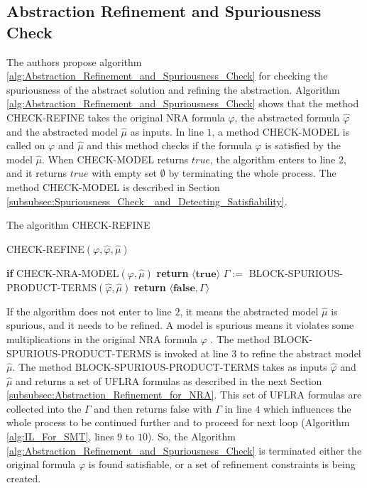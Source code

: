 \subsection{Abstraction Refinement and Spuriousness Check}
\label{subsec:Abstraction_Refinement_and_Spuriousness_Check}
The authors propose algorithm \ref{alg:Abstraction_Refinement_and_Spuriousness_Check} for checking the spuriousness of the abstract solution and refining the abstraction.
Algorithm \ref{alg:Abstraction_Refinement_and_Spuriousness_Check} shows that the method CHECK-REFINE takes the original NRA formula $\varphi$, the abstracted formula $\hat{\varphi}$ and the abstracted model $\hat{\mu}$ as inputs.
In line $1$, a method CHECK-MODEL is called on $\varphi$ and $\hat{\mu}$ and this method checks if the formula $\varphi$ is satisfied by the model $\hat{\mu}$.
When CHECK-MODEL returns $true$, the algorithm enters to line $2$, and it returns $true$ with empty set $\emptyset$ by terminating the whole process.
The method CHECK-MODEL is described in Section \ref{subsubsec:Spuriousness_Check_ and_Detecting_Satisfiability}.\newline

\begin{algorithm}
\caption{The algorithm CHECK-REFINE \cite{Cimatti:2018:ILS:3274693.3230639}} 
\label{alg:Abstraction_Refinement_and_Spuriousness_Check}
CHECK-REFINE$(\varphi, \hat{\varphi}, \hat{\mu})$
\begin{algorithmic}[1]
\State \textbf{if} CHECK-NRA-MODEL$(\varphi, \hat{\mu})$
\State \hspace{5mm}\textbf{return} $\langle \textbf{true} \rangle$
\State $\Gamma := $ BLOCK-SPURIOUS-PRODUCT-TERMS$(\hat{\varphi}, \hat{\mu})$
\State \textbf{return} $\langle \textbf{false}, \Gamma \rangle$
\end{algorithmic}
\end{algorithm}

\noindent If the algorithm does not enter to line $2$, it means the abstracted model $\hat{\mu}$ is spurious, and it needs to be refined.
A model is spurious means it violates some multiplications in the original NRA formula $\varphi$ \cite{Cimatti:2018:ILS:3274693.3230639}.
 The method  BLOCK-SPURIOUS-PRODUCT-TERMS is invoked at line $3$ to refine the abstract model $\hat{\mu}$.
The method BLOCK-SPURIOUS-PRODUCT-TERMS takes as inputs $\hat{\varphi}$ and $\hat{\mu}$ and returns a set of UFLRA formulas as described in the next Section \ref{subsubsec:Abstraction_Refinement_for_NRA}.
This set of UFLRA formulas are collected into the $\Gamma$ and then returns false with $\Gamma$ in line $4$ which influences the whole process to be continued further and to proceed for next loop (Algorithm \ref{alg:IL_For_SMT}, lines $9$ to $10$).
So, the Algorithm \ref{alg:Abstraction_Refinement_and_Spuriousness_Check} is terminated either the original formula $\varphi$ is found satisfiable, or a set of refinement constraints is being created.\newline

